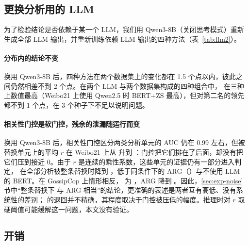 \subsection{更换分析用的 LLM}\label{sec:exp-llm2}

\begin{table}[!htbp]
\centering\footnotesize
\setlength{\tabcolsep}{3.6pt}
\caption{把分析用的 LLM 从 Qwen2.5-7B 换成 Qwen3-8B 后的 macro-F1（\%，3 个种子；Qwen2.5 一列取相同的种子）。各方法沿用在 Qwen2.5 上选出的学习率。“整条替换”为全部测试样本的 LLM 输出被替换。}\label{tab:llm2}
\end{table}

为了检验结论是否依赖于某一个 LLM，我们用 Qwen3-8B（关闭思考模式）重新生成全部 LLM 输出，并重新训练依赖 LLM 输出的四种方法（表~\ref{tab:llm2}）。

\paragraph{分布内的结论不变}
换用 Qwen3-8B 后，四种方法在两个数据集上的变化都在 1.5 个点以内，彼此之间仍然相差不到 2 个点。在两个 LLM 与两个数据集构成的四种组合中，\method{} 在三种上数值最高（Weibo21 上使用 Qwen2.5 时 BERT+ZS 最高），但对第二名的领先都不到 1 个点，在 3 个种子下不足以说明问题。

\paragraph{相关性门控是软门控，残余的泄漏随运行而变}
换用 Qwen3-8B 后，相关性门控区分两类分析单元的 AUC 仍在 0.99 左右，但被替换单元上的平均 $r$ 在 Weibo21 上从  升到 ：门控把它们排在了后面，却没有把它们压到接近 0。由于 $r$ 是连续的乘性系数，这些单元的证据仍有一部分进入判定，\method{} 在全部分析被整条替换时降到 ，低于同条件下的 ARG（）与不使用 LLM 的 BERT。在 GossipCop 上情形相反，\method{} 为 ，ARG 降到 。因此，\ref{sec:exp-noise} 节中“整条替换下 \method{} 与 ARG 相当”的结论，更准确的表述是两者互有高低、没有系统性的差别；\method{} 的退回并不精确，其程度取决于门控被压低的幅度。推理时对 $r$ 取硬阈值可能缓解这一问题，本文没有验证。

\subsection{开销}\label{sec:exp-cost}

